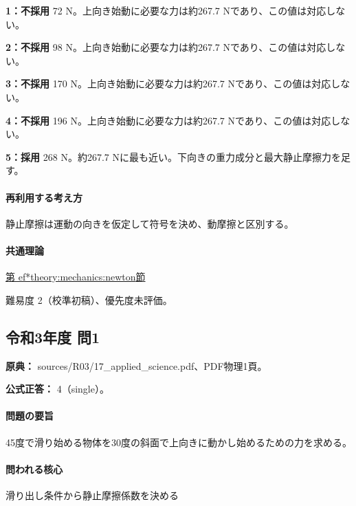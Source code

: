\noindent\textbf{1：不採用} 72 N。上向き始動に必要な力は約267.7 Nであり、この値は対応しない。\par

\noindent\textbf{2：不採用} 98 N。上向き始動に必要な力は約267.7 Nであり、この値は対応しない。\par

\noindent\textbf{3：不採用} 170 N。上向き始動に必要な力は約267.7 Nであり、この値は対応しない。\par

\noindent\textbf{4：不採用} 196 N。上向き始動に必要な力は約267.7 Nであり、この値は対応しない。\par

\noindent\textbf{5：採用} 268 N。約267.7 Nに最も近い。下向きの重力成分と最大静止摩擦力を足す。\par

\paragraph{再利用する考え方} 静止摩擦は運動の向きを仮定して符号を決め、動摩擦と区別する。

\paragraph{共通理論} \hyperref[theory:mechanics:newton]{第
ef*{theory:mechanics:newton}節}

\par 難易度 2（校準初稿）、優先度未評価。

\subsection{令和3年度 問1}
\label{q:r03-reg-applied-01}

\noindent\textbf{原典：} sources/R03/17\_applied\_science.pdf、PDF物理1頁。

\textbf{公式正答：} 4（single）。

\paragraph{問題の要旨} 45度で滑り始める物体を30度の斜面で上向きに動かし始めるための力を求める。

\paragraph{問われる核心} 滑り出し条件から静止摩擦係数を決める

